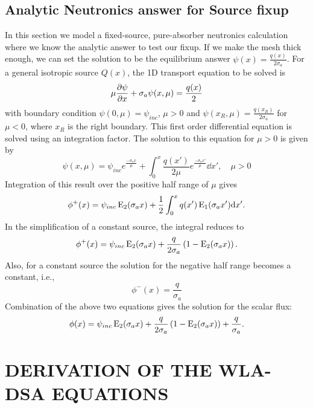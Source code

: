 \section{Analytic Neutronics answer for Source fixup}

In this section we model a fixed-source, pure-absorber neutronics calculation where we know the
analytic answer to test our fixup.  If we make the mesh thick enough, we can set the
solution to be the equilibrium answer $\psi(x) = \frac{q(x)}{2\sigma_a}$. For a general
isotropic source $Q(x)$, the 1D transport equation to be solved is
\begin{equation}
    \mu \frac{\partial \psi}{\partial x} + \sigma_a \psi(x,\mu) = \frac{q(x)}{2}
\end{equation}
with boundary condition $\psi(0,\mu)=\psi_{inc}$, $\mu>0$ and
$\psi(x_R,\mu)=\frac{q(x_R)}{2\sigma_a}$ for
$\mu<0$, where $x_R$ is the right boundary.  
This first order differential equation is solved using an integration factor.
The solution to this equation for $\mu>0$ is given by
\begin{equation}
    \psi(x,\mu) = \psi_{inc}e^{\frac{-\sigma_a x}{\mu}} + \int_0^x \frac{q(x')}{2\mu}
    e^{\frac{-\sigma_a x'}{\mu}} \dd x',\quad \mu>0
\end{equation}
Integration of this result over the positive half range of $\mu$ gives
\begin{equation}
    \phi^+(x) = \psi_{inc}\operatorname{E}_{2}(\sigma_a x) + \frac{1}{2}\int_0^x q(x')\operatorname{E}_{1}(\sigma_a x')
    \mathrm{d} x'.
\end{equation}
In the simplification of a constant source, the integral reduces to
\begin{equation}
    \phi^+(x) = \psi_{inc}\operatorname{E}_{2}(\sigma_a x) + \frac{q}{2\sigma_a} \left(1 -
    \operatorname{E}_{2}(\sigma_ax)\right).
\end{equation}
Also, for a constant source the solution for the negative half range becomes a constant, i.e.,
\begin{equation}
    \phi^{-}(x) = \frac{q}{\sigma_a}
\end{equation}
Combination of the above two equations gives the solution for the scalar flux:
\begin{equation}
    \phi(x) = \psi_{inc}\operatorname{E}_{2}(\sigma_a x) + \frac{q}{2\sigma_a} \left(1 -
    \operatorname{E}_{2}(\sigma_ax)\right) + \frac{q}{\sigma_a}.
\end{equation}

\chapter{\uppercase{Derivation of the WLA-DSA Equations}}
\label{sec:wla_derivation}

